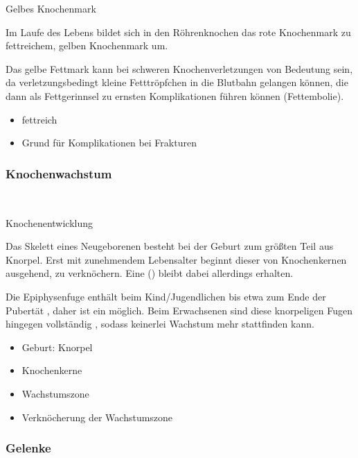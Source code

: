 {Gelbes Knochenmark}
{%
Im Laufe des Lebens bildet sich in den
Röhrenknochen das rote Knochenmark  zu fettreichem, gelben
Knochenmark um.

Das gelbe Fettmark kann bei schweren Knochenverletzungen von Bedeutung
sein, da verletzungs\-bedingt kleine Fetttröpfchen in die
Blutbahn gelangen können, die dann als Fettgerinnsel  zu ernsten
Komplikationen führen können
(Fettembolie).

}
{%
\begin{itemize}
  \item fettreich
  \item Grund für Komplikationen bei Frakturen
\end{itemize}
}
{}{}{}

\subsubsection{Knochenwachstum}~

{Knochenentwicklung}
{%
Das Skelett eines Neugeborenen besteht bei der Geburt zum größten
Teil aus Knorpel. Erst mit zunehmendem Lebensalter beginnt dieser von
Knochenkernen ausgehend, zu verknöchern. Eine
() bleibt dabei allerdings erhalten.

Die Epiphysenfuge enthält beim Kind/Jugendlichen bis
etwa zum Ende der Pubertät , daher ist ein 
möglich. Beim Erwachsenen sind diese knorpeligen Fugen
hingegen vollständig , sodass
keinerlei Wachstum mehr stattfinden kann.
}
{%
\begin{itemize}
  \item Geburt: Knorpel
  \item Knochenkerne
  \item Wachstumszone
  \item Verknöcherung der Wachstumszone
\end{itemize}
}
{}{}{}

\subsubsection{Gelenke}


